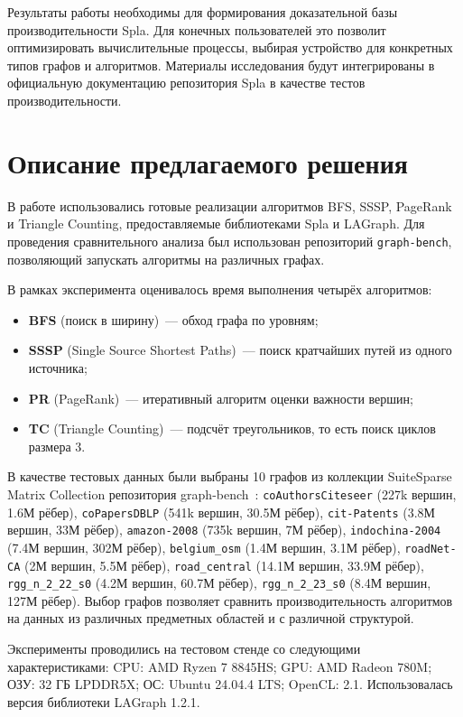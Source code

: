 \documentclass[a4paper]{article}
\begin{document}
Результаты работы необходимы для формирования доказательной базы производительности Spla. Для конечных пользователей это позволит оптимизировать вычислительные процессы, выбирая устройство для конкретных типов графов и алгоритмов. Материалы исследования будут интегрированы в официальную документацию репозитория Spla в качестве тестов производительности.
\section{Описание предлагаемого решения}
В работе использовались готовые реализации алгоритмов BFS, SSSP, PageRank и Triangle Counting, предоставляемые библиотеками Spla и LAGraph. Для проведения сравнительного анализа был использован репозиторий \texttt{graph-bench}, позволяющий запускать алгоритмы на различных графах.
	
В рамках эксперимента оценивалось время выполнения четырёх алгоритмов:
\begin{itemize}[noitemsep]
\item \textbf{BFS} (поиск в ширину)~--- обход графа по уровням;
\item \textbf{SSSP} (Single Source Shortest Paths)~--- поиск кратчайших путей из одного источника;
\item \textbf{PR} (PageRank)~--- итеративный алгоритм оценки важности вершин;
\item \textbf{TC} (Triangle Counting)~--- подсчёт треугольников, то есть поиск циклов размера 3.
\end{itemize}
	
В качестве тестовых данных были выбраны 10 графов из коллекции SuiteSparse Matrix Collection репозитория graph-bench~\cite{graph-bench}: \texttt{coAuthorsCiteseer} (227k вершин, 1.6М рёбер), \texttt{coPapersDBLP} (541k вершин, 30.5М рёбер), \texttt{cit-Patents} (3.8М вершин, 33М рёбер), \texttt{amazon-2008} (735k вершин, 7М рёбер), \texttt{indochina-2004} (7.4М вершин, 302М рёбер), \texttt{belgium\_osm} (1.4М вершин, 3.1М рёбер), \texttt{roadNet-CA} (2М вершин, 5.5М рёбер), \texttt{road\_central} (14.1М вершин, 33.9М рёбер), \texttt{rgg\_n\_2\_22\_s0} (4.2М вершин, 60.7М рёбер), \texttt{rgg\_n\_2\_23\_s0} (8.4М вершин, 127М рёбер). Выбор графов позволяет сравнить производительность алгоритмов на данных из различных предметных областей и с различной структурой.
	
Эксперименты проводились на тестовом стенде со следующими характеристиками: CPU: AMD Ryzen 7 8845HS; GPU: AMD Radeon 780M; ОЗУ: 32 ГБ LPDDR5X; ОС: Ubuntu 24.04.4 LTS; OpenCL: 2.1. Использовалась версия библиотеки LAGraph 1.2.1.
	
\end{document}
